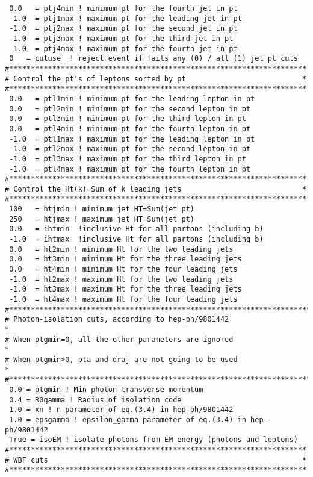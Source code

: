 \begin{enumerate}
\begin{lstlisting}
 0.0   = ptj4min ! minimum pt for the fourth jet in pt
 -1.0  = ptj1max ! maximum pt for the leading jet in pt 
 -1.0  = ptj2max ! maximum pt for the second jet in pt
 -1.0  = ptj3max ! maximum pt for the third jet in pt
 -1.0  = ptj4max ! maximum pt for the fourth jet in pt
 0   = cutuse  ! reject event if fails any (0) / all (1) jet pt cuts
#*********************************************************************
# Control the pt's of leptons sorted by pt                           *
#*********************************************************************
 0.0   = ptl1min ! minimum pt for the leading lepton in pt
 0.0   = ptl2min ! minimum pt for the second lepton in pt
 0.0   = ptl3min ! minimum pt for the third lepton in pt
 0.0   = ptl4min ! minimum pt for the fourth lepton in pt
 -1.0  = ptl1max ! maximum pt for the leading lepton in pt 
 -1.0  = ptl2max ! maximum pt for the second lepton in pt
 -1.0  = ptl3max ! maximum pt for the third lepton in pt
 -1.0  = ptl4max ! maximum pt for the fourth lepton in pt
#*********************************************************************
# Control the Ht(k)=Sum of k leading jets                            *
#*********************************************************************
 100   = htjmin ! minimum jet HT=Sum(jet pt)
 250   = htjmax ! maximum jet HT=Sum(jet pt)
 0.0   = ihtmin  !inclusive Ht for all partons (including b)
 -1.0  = ihtmax  !inclusive Ht for all partons (including b)
 0.0   = ht2min ! minimum Ht for the two leading jets
 0.0   = ht3min ! minimum Ht for the three leading jets
 0.0   = ht4min ! minimum Ht for the four leading jets
 -1.0  = ht2max ! maximum Ht for the two leading jets
 -1.0  = ht3max ! maximum Ht for the three leading jets
 -1.0  = ht4max ! maximum Ht for the four leading jets
#***********************************************************************
# Photon-isolation cuts, according to hep-ph/9801442                   *
# When ptgmin=0, all the other parameters are ignored                  *
# When ptgmin>0, pta and draj are not going to be used                 *
#***********************************************************************
 0.0 = ptgmin ! Min photon transverse momentum
 0.4 = R0gamma ! Radius of isolation code
 1.0 = xn ! n parameter of eq.(3.4) in hep-ph/9801442
 1.0 = epsgamma ! epsilon_gamma parameter of eq.(3.4) in hep-ph/9801442
 True = isoEM ! isolate photons from EM energy (photons and leptons)
#*********************************************************************
# WBF cuts                                                           *
#*********************************************************************

\end{lstlisting}
\end{enumerate}
